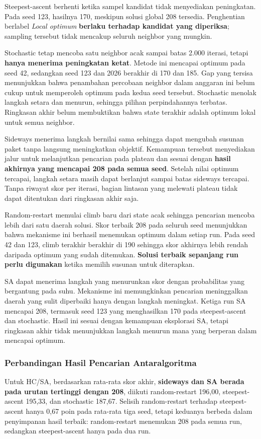 \documentclass[12pt,a4paper]{article}
\begin{document}
Steepest-ascent berhenti ketika sampel kandidat tidak menyediakan peningkatan. Pada seed 123, hasilnya 170, meskipun solusi global 208 tersedia. Penghentian berlabel \textit{Local optimum} \textbf{berlaku terhadap kandidat yang diperiksa}; sampling tersebut tidak mencakup seluruh neighbor yang mungkin.

Stochastic tetap mencoba satu neighbor acak sampai batas 2.000 iterasi, tetapi \textbf{hanya menerima peningkatan ketat}. Metode ini mencapai optimum pada seed 42, sedangkan seed 123 dan 2026 berakhir di 170 dan 185. Gap yang tersisa menunjukkan bahwa penambahan percobaan neighbor dalam anggaran ini belum cukup untuk memperoleh optimum pada kedua seed tersebut. Stochastic menolak langkah setara dan menurun, sehingga pilihan perpindahannya terbatas. Ringkasan akhir belum membuktikan bahwa state terakhir adalah optimum lokal untuk semua neighbor.

Sideways menerima langkah bernilai sama sehingga dapat mengubah susunan paket tanpa langsung meningkatkan objektif. Kemampuan tersebut menyediakan jalur untuk melanjutkan pencarian pada plateau dan sesuai dengan \textbf{hasil akhirnya yang mencapai 208 pada semua seed}. Setelah nilai optimum tercapai, langkah setara masih dapat berlanjut sampai batas sideways tercapai. Tanpa riwayat skor per iterasi, bagian lintasan yang melewati plateau tidak dapat ditentukan dari ringkasan akhir saja.

Random-restart memulai climb baru dari state acak sehingga pencarian mencoba lebih dari satu daerah solusi. Skor terbaik 208 pada seluruh seed menunjukkan bahwa mekanisme ini berhasil menemukan optimum dalam setiap run. Pada seed 42 dan 123, climb terakhir berakhir di 190 sehingga skor akhirnya lebih rendah daripada optimum yang sudah ditemukan. \textbf{Solusi terbaik sepanjang run perlu digunakan} ketika memilih susunan untuk diterapkan.

SA dapat menerima langkah yang menurunkan skor dengan probabilitas yang bergantung pada suhu. Mekanisme ini memungkinkan pencarian meninggalkan daerah yang sulit diperbaiki hanya dengan langkah meningkat. Ketiga run SA mencapai 208, termasuk seed 123 yang menghasilkan 170 pada steepest-ascent dan stochastic. Hasil ini sesuai dengan kemampuan eksplorasi SA, tetapi ringkasan akhir tidak menunjukkan langkah menurun mana yang berperan dalam mencapai optimum.

\subsubsection{Perbandingan Hasil Pencarian Antaralgoritma}
Untuk HC/SA, berdasarkan rata-rata skor akhir, \textbf{sideways dan SA berada pada urutan tertinggi dengan 208}, diikuti random-restart 196,00, steepest-ascent 195,33, dan stochastic 187,67. Selisih random-restart terhadap steepest-ascent hanya 0,67 poin pada rata-rata tiga seed, tetapi keduanya berbeda dalam penyimpanan hasil terbaik: random-restart menemukan 208 pada semua run, sedangkan steepest-ascent hanya pada dua run.
\end{document}
